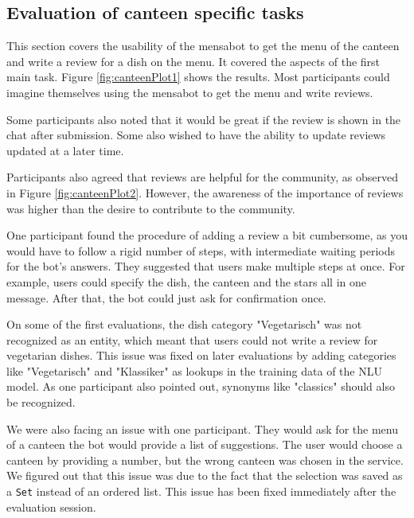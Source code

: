\subsection{Evaluation of canteen specific tasks}  
This section covers the usability of the mensabot to get the menu of the canteen and write a review for a dish on the menu. It covered the aspects of the first main task. Figure \ref{fig:canteenPlot1} shows the results. Most participants could imagine themselves using the mensabot to get the menu and write reviews.
 
Some participants also noted that it would be great if the review is shown in the chat after submission. Some also wished to have the ability to update reviews updated at a later time.

Participants also agreed that reviews are helpful for the community, as observed in Figure \ref{fig:canteenPlot2}. 
However, the awareness of the importance of reviews was higher than the desire to contribute to the community. 

One participant found the procedure of adding a review a bit cumbersome, as you would have to follow a rigid number of steps, with intermediate waiting periods for the bot's answers. They suggested that users make multiple steps at once. For example, users could specify the dish, the canteen and the stars all in one message. After that, the bot could just ask for confirmation once.

On some of the first evaluations, the dish category "Vegetarisch" was not recognized as an entity, which meant that users could not write a review for vegetarian dishes. This issue was fixed on later evaluations by adding categories like "Vegetarisch" and "Klassiker" as lookups in the training data of the NLU model. As one participant also pointed out, synonyms like "classics" should also be recognized.

We were also facing an issue with one participant. They would ask for the menu of a canteen the bot would provide a list of suggestions. The user would choose a  canteen by providing a number, but the wrong canteen was chosen in the service. We figured out that this issue was due to the fact that the selection was saved as a \texttt{Set} instead of an ordered list.
This issue has been fixed immediately after the evaluation session.

